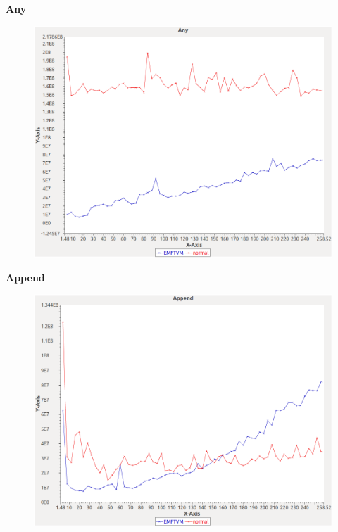 \noindent\textbf{Any}

\begin{figure}[h]
\centering
\includegraphics[width=\textwidth]{../graphs/orderedset/Any}
\end{figure}
\pagebreak

\noindent\textbf{Append}

\begin{figure}[h]
\centering
\includegraphics[width=\textwidth]{../graphs/orderedset/Append}
\end{figure}
\pagebreak

